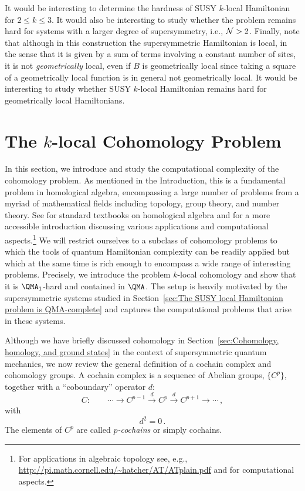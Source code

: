 \documentclass[11pt]{article}
\numberwithin{equation}{section}
\def\cN{{\cal N}}
\newcommand\equ[1] {\begin{equation}#1\end{equation}}
\renewcommand\( {\left(}
\renewcommand\) {\right)}
\begin{document}
It would be interesting to determine the hardness of  {\sc SUSY $k$-local Hamiltonian} for $2\leq k\leq3$. It would also be interesting to study whether the problem remains hard for systems with a larger degree of supersymmetry, i.e.,  $\cN>2$. Finally, note that although in this construction the supersymmetric Hamiltonian is local, in the sense that it is given by a sum of terms involving a constant number of sites, it is not {\it geometrically} local, even if $B$ is geometrically local since taking a square of a geometrically local function is in general not geometrically local. It would be interesting to study whether {\sc SUSY $k$-local Hamiltonian} remains hard for geometrically local Hamiltonians.




\section{The $k$-local Cohomology Problem}
\label{sec:The k-local cohomology problem}

In this section, we introduce and study the computational complexity of the cohomology problem. As mentioned in the Introduction, this is a fundamental problem in homological algebra, encompassing a large number of problems from a myriad of mathematical fields including  topology, group theory, and number theory. See \cite{CartanEilenberg+2016,weibel_1994} for standard textbooks on homological algebra and \cite{KaczynskiTomasz2004Ch/T} for a more accessible introduction discussing various applications and computational aspects.\footnote{For applications in algebraic topology see, e.g., \url{http://pi.math.cornell.edu/~hatcher/AT/ATplain.pdf} and \cite{CompTopBook,zomorodian_2005} for computational aspects.} 
We will restrict ourselves to a subclass of cohomology problems to which the tools of quantum Hamiltonian complexity can be readily applied but which at the same time is rich enough to encompass a wide range of interesting problems. Precisely,  we introduce the problem {\sc $k$-local cohomology} and show that it is $\QMA_{1}$-hard and contained in   $\QMA$. The setup is  heavily motivated by the supersymmetric systems studied in Section~\ref{sec:The SUSY local Hamiltonian problem is QMA-complete} and captures the computational problems that arise in these systems.

Although we have briefly discussed cohomology in Section~\ref{sec:Cohomology, homology, and ground states} in the context of supersymmetric quantum mechanics, we now review the general definition of a cochain complex and cohomology groups. A cochain complex is a sequence of Abelian groups, $\{C^{p}\}$, together with a ``coboundary'' operator $d$:
\equ{\label{complexN}
C: \qquad \cdots  \rightarrow  C^{p-1}\xrightarrow{d}C^{p}\xrightarrow{d} C^{p+1} \rightarrow \cdots  \,,
}
with 
\equ{\label{nilpd}
d^{2}=0\,.
}
The elements of $C^{p}$ are called {\it $p$-cochains} or simply cochains. 
\end{document}
